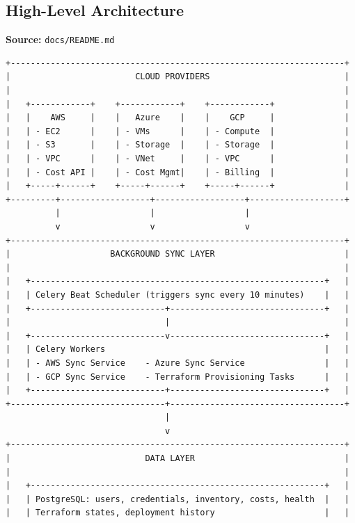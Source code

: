 \subsection{High-Level Architecture}
\textbf{Source:} \texttt{docs/README.md}
\begin{lstlisting}[numbers=none,basicstyle=\ttfamily\tiny,caption={High-Level Architecture Adapted from docs/README.md}]
+-------------------------------------------------------------------+
|                         CLOUD PROVIDERS                           |
|                                                                   |
|   +------------+    +------------+    +------------+              |
|   |    AWS     |    |   Azure    |    |    GCP     |              |
|   | - EC2      |    | - VMs      |    | - Compute  |              |
|   | - S3       |    | - Storage  |    | - Storage  |              |
|   | - VPC      |    | - VNet     |    | - VPC      |              |
|   | - Cost API |    | - Cost Mgmt|    | - Billing  |              |
|   +-----+------+    +-----+------+    +-----+------+              |
+---------+------------------+------------------+-------------------+
          |                  |                  |
          v                  v                  v
+-------------------------------------------------------------------+
|                    BACKGROUND SYNC LAYER                          |
|                                                                   |
|   +-----------------------------------------------------------+   |
|   | Celery Beat Scheduler (triggers sync every 10 minutes)    |   |
|   +---------------------------+-------------------------------+   |
|                               |                                   |
|   +---------------------------v-------------------------------+   |
|   | Celery Workers                                            |   |
|   | - AWS Sync Service    - Azure Sync Service                |   |
|   | - GCP Sync Service    - Terraform Provisioning Tasks      |   |
|   +---------------------------+-------------------------------+   |
+-------------------------------+-----------------------------------+
                                |
                                v
+-------------------------------------------------------------------+
|                           DATA LAYER                              |
|                                                                   |
|   +-----------------------------------------------------------+   |
|   | PostgreSQL: users, credentials, inventory, costs, health  |   |
|   | Terraform states, deployment history                      |   |

\end{lstlisting}
